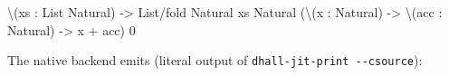 \documentclass[]{article}
\newenvironment{Shaded}{}{}
\newcommand{\CommentTok}[1]{\textcolor[rgb]{0.38,0.63,0.69}{\textit{#1}}}
\newcommand{\DecValTok}[1]{\textcolor[rgb]{0.25,0.63,0.44}{#1}}
\newcommand{\NormalTok}[1]{#1}
\newcommand{\OperatorTok}[1]{\textcolor[rgb]{0.40,0.40,0.40}{#1}}
\begin{document}
\begin{Shaded}
\begin{Highlighting}[]
\OperatorTok{\textbackslash{}}\NormalTok{(xs}\CommentTok{ }\NormalTok{:}\CommentTok{ }\NormalTok{List}\CommentTok{ }\NormalTok{Natural)}\CommentTok{ }\OperatorTok{{-}\textgreater{}}
\CommentTok{  }\NormalTok{List/fold}\CommentTok{ }\NormalTok{Natural}\CommentTok{ }\NormalTok{xs}\CommentTok{ }\NormalTok{Natural}
\CommentTok{    }\NormalTok{(}\OperatorTok{\textbackslash{}}\NormalTok{(x}\CommentTok{ }\NormalTok{:}\CommentTok{ }\NormalTok{Natural)}\CommentTok{ }\OperatorTok{{-}\textgreater{}}\CommentTok{ }\OperatorTok{\textbackslash{}}\NormalTok{(acc}\CommentTok{ }\NormalTok{:}\CommentTok{ }\NormalTok{Natural)}\CommentTok{ }\OperatorTok{{-}\textgreater{}}\CommentTok{ }\NormalTok{x}\CommentTok{ }\NormalTok{+}\CommentTok{ }\NormalTok{acc)}\CommentTok{ }\DecValTok{0}
\end{Highlighting}
\end{Shaded}

The native backend emits (literal output of
\texttt{dhall-jit-print\ -\/-csource}):
\end{document}
